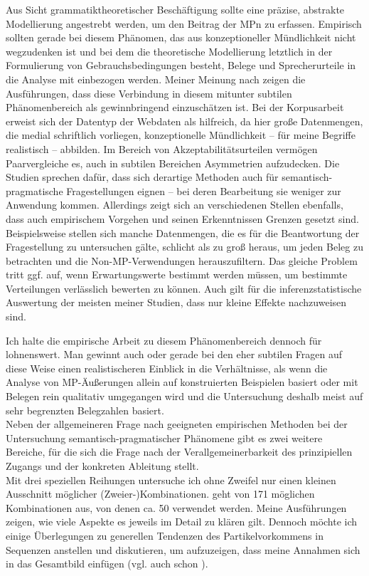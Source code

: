 Aus Sicht grammatiktheoretischer Beschäftigung sollte eine präzise, abstrakte Modellierung angestrebt werden, um den Beitrag der MPn zu erfassen. Empirisch sollten gerade bei diesem Phänomen, das aus konzeptioneller Mündlichkeit nicht wegzudenken ist und bei dem die theoretische Modellierung letztlich in der Formulierung von Gebrauchsbedingungen besteht, Belege und Sprecherurteile in die Analyse mit einbezogen werden. Meiner Meinung nach zeigen die Ausführungen, dass diese Verbindung in diesem mitunter subtilen Phänomenbereich als gewinnbringend einzuschätzen ist. Bei der Korpusarbeit erweist sich der Datentyp der Webdaten als hilfreich, da hier große Datenmengen, die medial schriftlich vorliegen, konzeptionelle Mündlichkeit – für meine Begriffe realistisch – abbilden. Im Bereich von Akzeptabilitätsurteilen vermögen Paarvergleiche es, auch in subtilen Bereichen Asymmetrien aufzudecken. Die Studien sprechen dafür, dass sich derartige Methoden auch für semantisch-pragmatische Fragestellungen eignen – bei deren Bearbeitung sie weniger zur Anwendung kommen. Allerdings zeigt sich an verschiedenen Stellen ebenfalls, dass auch empirischem Vorgehen und seinen Erkenntnissen Grenzen gesetzt sind. Beispielsweise stellen sich manche Datenmengen, die es für die Beantwortung der Frage\-stellung zu untersuchen gälte, schlicht als zu groß heraus, um jeden Beleg zu betrachten und die Non-MP-Verwendungen herauszufiltern. Das gleiche Problem tritt ggf. auf, wenn Erwartungswerte bestimmt werden müssen, um bestimmte Verteilungen verlässlich bewerten zu können. Auch gilt für die inferenzstatistische Auswertung der meisten meiner Studien, dass nur kleine Effekte nachzuweisen sind.

Ich halte die empirische Arbeit zu diesem Phänomenbereich dennoch für loh\-nenswert. Man gewinnt auch oder gerade bei den eher subtilen Fragen auf diese Weise einen realistischeren Einblick in die Verhältnisse, als wenn die Analyse von MP-Äußerungen allein auf konstruierten Beispielen basiert oder mit Belegen rein qualitativ umgegangen wird und die Untersuchung deshalb meist auf sehr begrenzten Belegzahlen basiert.\\

\noindent
Neben der allgemeineren Frage nach geeigneten empirischen Methoden bei der Untersuchung semantisch-pragmatischer Phänomene gibt es zwei weitere Berei\-che, für die sich die Frage nach der Verallgemeinerbarkeit des prinzipiellen Zugangs und der konkreten Ableitung stellt.\\

\noindent
Mit drei speziellen Reihungen untersuche ich ohne Zweifel nur einen kleinen Ausschnitt möglicher (Zweier-)Kombinationen. \citet[280]{Thurmair1989} geht von 171 möglichen Kombinationen aus, von denen ca. 50 verwendet werden. Meine Ausführungen zeigen, wie viele Aspekte es jeweils im Detail zu klären gilt. Dennoch möchte ich einige Überlegungen zu generellen Tendenzen des Partikelvor\-kommens in Sequenzen anstellen und diskutieren, um aufzuzeigen, dass meine Annahmen sich in das Gesamtbild einfügen (vgl. auch schon \citealt[236]{Mueller2017b}).

